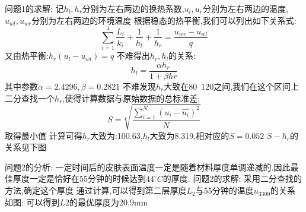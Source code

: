 \documentclass[utf8]{ctexart}
\begin{document}
    问题1的求解:
    记\(h_l,h_r\)分别为左右两边的换热系数,\(u_l,u_r\)分别为左右两边的温度,\(u_{wl},u_{wr}\)分别为左右两边的环境温度
    根据稳态的热平衡,我们可以列出如下关系式:
    \[\sum_{i=1}^4 \frac{L_i}{k_i} + \frac{1}{h_l} + \frac{1}{h_r} = \frac{u_{wr}-u_{wl}}{q}\]
    又由热平衡:\( h_r(u_l-u_{wl}) = q\)
    不难得出\(h_r,h_l\)的关系:
    \[h_l = \frac{\alpha h_r}{1+\beta hr}\]
    其中参数\(\alpha = 2.4296 ,\beta = 0.2821\)
    不难发现\(h_r\)大致在80~120之间,我们在这个区间上二分查找一个\(h_r\),使得计算数据与原始数据的总标准差:
    \[S = \sqrt{\frac{\sum_{i=1}^{N}(u_i-\hat{u_i})^2}{N}}\]
    取得最小值
    计算可得\(h_r\)大致为:100.63,\(h_l\)大致为8.319,相对应的\(S = 0.052\)
    \(S-h_r\)的关系见下图

    问题2的分析:
    一定时间后的皮肤表面温度一定是随着材料厚度单调递减的.因此最佳厚度一定是恰好在55分钟的时候达到\(44^{\circ}C\)的厚度.
    问题2的求解:
    采用二分查找的方法,确定这个厚度
    通过计算,可以得到第二层厚度\(L_2\)与55分钟的温度\(u_{3300}\)的关系如图:
    可以得到\(L2\)的最优厚度为20.9mm
\end{document}
